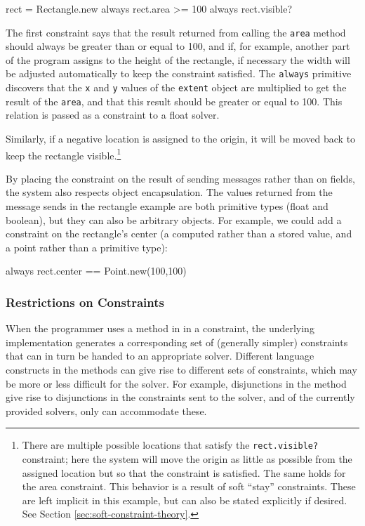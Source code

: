 \begin{code}
rect = Rectangle.new
always { rect.area >= 100 }
always { rect.visible? }
\end{code}

The first constraint says that the result returned from calling the
\lstinline{area} method should always be greater than or equal to 100,
and if, for example, another part of the program assigns to the height
of the rectangle, if necessary the width will be adjusted
automatically to keep the constraint satisfied. The \lstinline{always}
primitive discovers that the \lstinline{x} and \lstinline{y} values of
the \lstinline{extent} object are multiplied to get the result of the
\lstinline{area}, and that this result should be greater or equal to
100. This relation is passed as a constraint to a float solver.

Similarly, if a negative location is assigned to the origin, it will
be moved back to keep the rectangle visible.\footnote{There are
  multiple possible locations that satisfy the
  \lstinline{rect.visible?} constraint; here the system will move the
  origin as little as possible from the assigned location but so that
  the constraint is satisfied.  The same holds for the area
  constraint.  This behavior is a result of soft ``stay''
  constraints. These are left implicit in this example, but can also
  be stated explicitly if desired.  See Section
  \ref{sec:soft-constraint-theory}.}

By placing the constraint on the result of sending messages rather
than on fields, the system also respects object encapsulation.  The
values returned from the message sends in the rectangle example are
both primitive types (float and boolean), but they can also be
arbitrary objects.  For example, we could add a constraint on the
rectangle's center (a computed rather than a stored value, and a point
rather than a primitive type):

\begin{code}[numbers=none]
always { rect.center == Point.new(100,100) }
\end{code}

\subsubsection{Restrictions on Constraints}
\label{sec:constraint-restrictions}
When the programmer uses a method in \langname in a constraint, the
underlying implementation generates a corresponding set of (generally
simpler) constraints that can in turn be handed to an appropriate
solver.  Different language constructs in the methods can give rise to
different sets of constraints, which may be more or less difficult for
the solver.  For example, disjunctions in the method
give rise to disjunctions in the constraints sent
to the solver, and of the currently provided solvers, only \zthree
can accommodate these.

